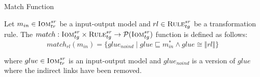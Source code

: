 \begin{definition}{Match Function}
\label{def:match_function}

Let $m_{in}\in \textsc{Iom}^{sr}_{tr}$ be a input-output model and $rl\in \textsc{Rule}^{sr}_{tg}$ be a transformation
rule. The $match : \textsc{Iom}^{sr}_{tg}\times \textsc{Rule}^{sr}_{tg}\rightarrow
\mathcal{P}(\textsc{Iom}^{sr}_{tg})$ function is defined as follows: $$match_{rl}(m_{in})= \big\{ glue_{noind}\;|\;
glue\sqsubseteq m_{in}^{*} \land glue \cong \Vert rl\Vert\big\}$$

where $glue\in \textsc{Iom}^{sr}_{tr}$ is an input-output model and $glue_{noind}$ is a version of $glue$ where the indirect links have been removed.
% 


\end{definition}

